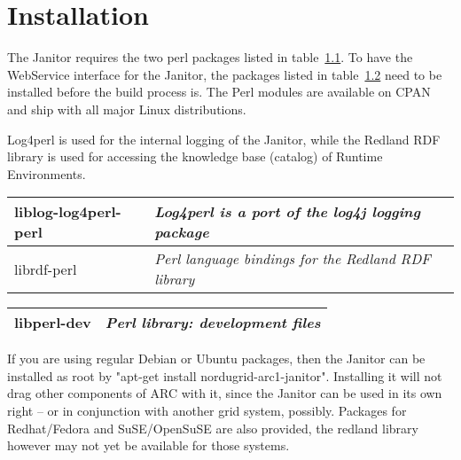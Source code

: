 \chapter{Installation} 




The Janitor requires the two perl packages listed in
table~\ref{tab:installDependencies}. To have the WebService
interface for the Janitor, the packages listed in
table~\ref{tab:installDependenciesOptional}
need to be installed before
the build process is. The Perl modules are available on CPAN and ship
with all major Linux distributions.  

\begin{table}[!h]
   \begin{center}
		   {Log4perl is used for the internal logging of the
		   Janitor, while the Redland RDF library is used
		   for accessing the knowledge base (catalog) of
		   Runtime Environments.}
        \label{tab:installDependencies}
	\begin{tabular}{|p{3cm}|p{7cm}|}
	\hline
	   liblog-log4perl-perl & \textit{Log4perl is a port of the log4j logging package}\\
	\hline
	   librdf-perl          & \textit{Perl language bindings for the Redland RDF library}\\
	\hline
	\end{tabular} 
   \end{center}
\end{table}
\begin{table}[!h]
   \begin{center}
        \label{tab:installDependenciesOptional}
	\begin{tabular}{|p{3cm}|p{7cm}|}
	\hline
	   libperl-dev & \textit{ Perl library: development files}\\
	\hline
	\end{tabular}
   \end{center}
\end{table}
\forcelinebreak

If you are using regular Debian or Ubuntu packages, then the Janitor
can be installed as root by "apt-get install nordugrid-arc1-janitor".
Installing it will not drag other components of ARC with it, since the
Janitor can be used in its own right -- or in conjunction with another
grid system, possibly. Packages for Redhat/Fedora and SuSE/OpenSuSE are
also provided, the redland library however may not yet be available for
those systems.

